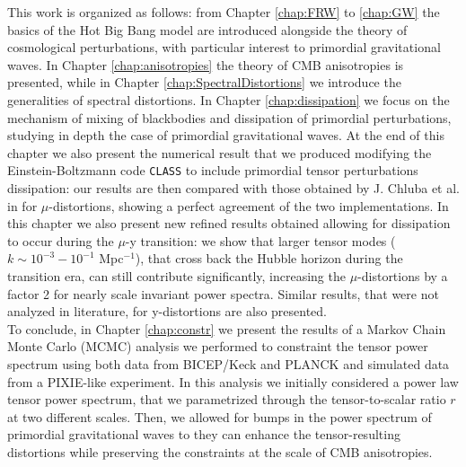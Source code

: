 This work is organized as follows: from Chapter \ref{chap:FRW} to \ref{chap:GW} the basics of the Hot Big Bang model are introduced alongside the theory of cosmological perturbations, with particular interest to primordial gravitational waves. In Chapter \ref{chap:anisotropies} the theory of CMB anisotropies is presented, while in Chapter \ref{chap:SpectralDistortions} we introduce the generalities of spectral distortions. In Chapter \ref{chap:dissipation} we focus on the mechanism of mixing of blackbodies and dissipation of primordial perturbations, studying in depth the case of primordial gravitational waves. At the end of this chapter we also present the numerical result that we produced modifying the Einstein-Boltzmann code \texttt{CLASS} \cite{CLASS} to include primordial tensor perturbations dissipation: our results are then compared with those obtained by J. Chluba et al. in \cite{Chluba_tens_diss} for $\mu$-distortions, showing a perfect agreement of the two implementations. In this chapter we also present new refined results obtained allowing for dissipation to occur during the $\mu$-y transition: we show that larger tensor modes ($k\sim 10^{-3}-10^{-1}$ Mpc$^{-1}$), that cross back the Hubble horizon during the transition era, can still contribute significantly, increasing the $\mu$-distortions by a factor 2 for nearly scale invariant power spectra. Similar results, that were not analyzed in literature, for y-distortions are also presented.\\
To conclude, in Chapter \ref{chap:constr} we present the results of a Markov Chain Monte Carlo (MCMC) analysis we performed to constraint the tensor power spectrum using both data from BICEP/Keck \cite{Ade_2021} and PLANCK \cite{planck2018results} and simulated data from a PIXIE-like experiment. In this analysis we initially considered a power law tensor power spectrum, that we parametrized through the tensor-to-scalar ratio $r$ at two different scales. Then, we allowed for bumps in the power spectrum of primordial gravitational waves to they can enhance the tensor-resulting distortions while preserving the constraints at the scale of CMB anisotropies.    